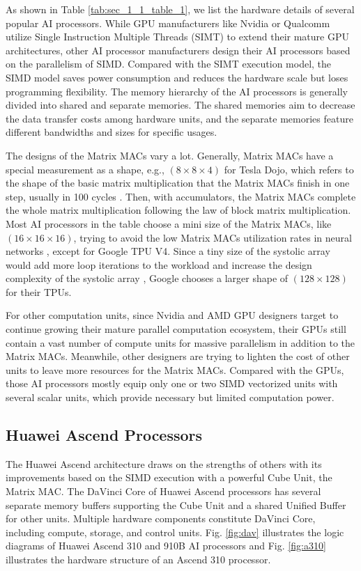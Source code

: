 As shown in Table \ref{tab:sec_1_1_table_1}, we list the hardware details of several popular AI processors. While GPU manufacturers like Nvidia or Qualcomm utilize Single Instruction Multiple Threads (SIMT) to extend their mature GPU architectures, other AI processor manufacturers design their AI processors based on the parallelism of SIMD. Compared with the SIMT execution model, the SIMD model saves power consumption and reduces the hardware scale but loses programming flexibility. The memory hierarchy of the AI processors is generally divided into shared and separate memories. The shared memories aim to decrease the data transfer costs among hardware units, and the separate memories feature different bandwidths and sizes for specific usages. 

The designs of the Matrix MACs vary a lot. Generally, Matrix MACs have a special measurement as a shape, e.g., $(8 \times 8 \times 4)$ for Tesla Dojo, which refers to the shape of the basic matrix multiplication that the Matrix MACs finish in one step, usually in 100 cycles \cite{Mi300}. Then, with accumulators, the Matrix MACs complete the whole matrix multiplication following the law of block matrix multiplication. Most AI processors in the table choose a mini size of the Matrix MACs, like $(16 \times 16 \times 16)$, trying to avoid the low Matrix MACs utilization rates in neural networks \cite{DBLP:conf/hotchips/LiaoTXZ19}, except for Google TPU V4. Since a tiny size of the systolic array would add more loop iterations to the workload and increase the design complexity of the systolic array \cite{DBLP:journals/csur/XuMGL24}, Google chooses a larger shape of $(128 \times 128)$ for their TPUs. 

For other computation units, since Nvidia and AMD GPU designers target to continue growing their mature parallel computation ecosystem, their GPUs still contain a vast number of compute units for massive parallelism in addition to the Matrix MACs. Meanwhile, other designers are trying to lighten the cost of other units to leave more resources for the Matrix MACs. Compared with the GPUs, those AI processors mostly equip only one or two SIMD vectorized units with several scalar units, which provide necessary but limited computation power.

\subsection{Huawei Ascend Processors}
\label{Sec:1_1_2}

The Huawei Ascend architecture draws on the strengths of others with its improvements based on the SIMD execution with a powerful Cube Unit, the Matrix MAC. The DaVinci Core of Huawei Ascend processors has several separate memory buffers supporting the Cube Unit and a shared Unified Buffer for other units. Multiple hardware components constitute DaVinci Core, including compute, storage, and control units. Fig. \ref{fig:dav} illustrates the logic diagrams of Huawei Ascend 310 and 910B AI processors and Fig. \ref{fig:a310} illustrates the hardware structure of an Ascend 310 processor.

